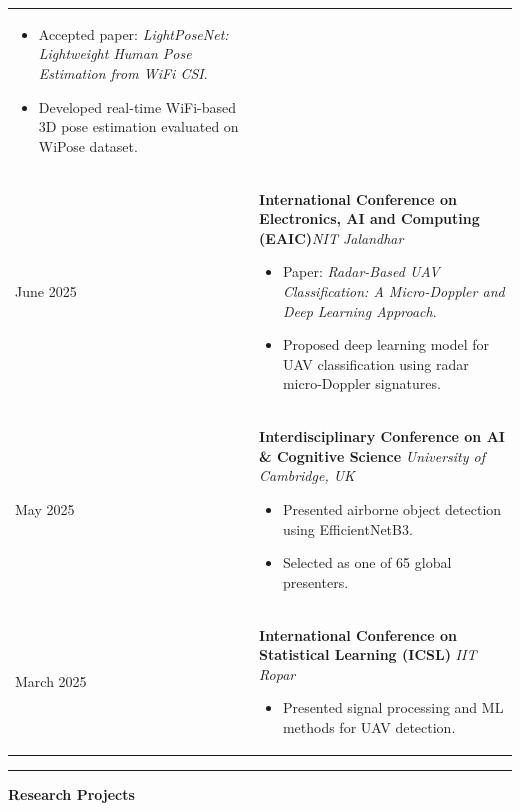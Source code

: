 \documentclass[11pt]{article}
\newcommand{\cvsection}[1]{%
\vspace{12pt}%
\noindent%
{\color{headingblue}\rule{40pt}{5pt}}%
\hspace{10pt}%
{\Large\textbf{\color{headingblue}#1}}%
\vspace{6pt}%
\color{black}%
}
\begin{document}
\begin{longtable}{@{}p{95pt}p{\dimexpr\textwidth-95pt\relax}@{}}
\begin{itemize}[leftmargin=*,nosep]
\item Accepted paper: \textit{LightPoseNet: Lightweight Human Pose Estimation from WiFi CSI}.
\item Developed real-time WiFi-based 3D pose estimation evaluated on WiPose dataset.
\end{itemize}
\\[6pt]

June 2025 &
\textbf{International Conference on Electronics, AI and Computing (EAIC)}\hfill \textit{NIT Jalandhar}

\begin{itemize}[leftmargin=*,nosep]
\item Paper: \textit{Radar-Based UAV Classification: A Micro-Doppler and Deep Learning Approach}.
\item Proposed deep learning model for UAV classification using radar micro-Doppler signatures.
\end{itemize}
\\[6pt]

May 2025 &
\textbf{Interdisciplinary Conference on AI \& Cognitive Science} \hfill \textit{University of Cambridge, UK}

\begin{itemize}[leftmargin=*,nosep]
\item Presented airborne object detection using EfficientNetB3.
\item Selected as one of 65 global presenters.
\end{itemize}
\\[6pt]

March 2025 &
\textbf{International Conference on Statistical Learning (ICSL)} \hfill \textit{IIT Ropar}

\begin{itemize}[leftmargin=*,nosep]
\item Presented signal processing and ML methods for UAV detection.
\end{itemize}

\end{longtable}
\endgroup


\cvsection{Research Projects}
\end{document}
